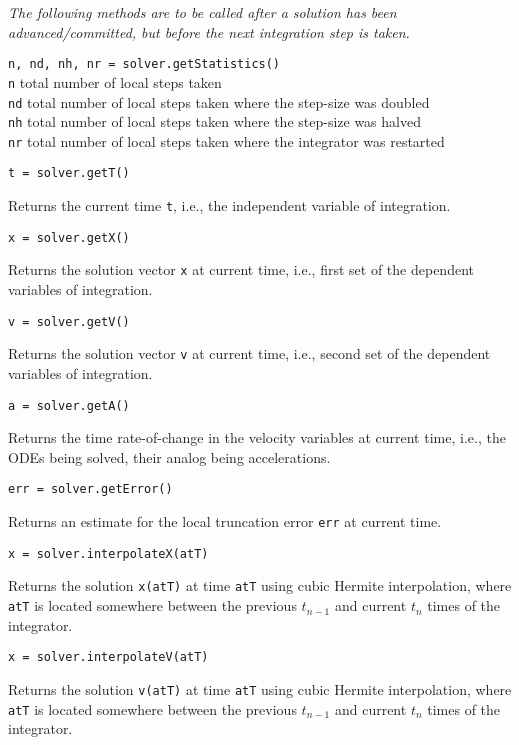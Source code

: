\medskip\noindent
\textit{The following methods are to be called after a solution has been advanced\slash committed, but before the next integration step is taken.}

\medskip\noindent
\texttt{n, nd, nh, nr = solver.getStatistics()} \\
\indent \texttt{n} \;\;\;\: total number of local steps taken \\
\indent \texttt{nd} \;\; total number of local steps taken where the step-size was doubled \\
\indent \texttt{nh} \;\; total number of local steps taken where the step-size was halved \\
\indent \texttt{nr} \;\; total number of local steps taken where the integrator was restarted 

\medskip\noindent
\texttt{t = solver.getT()}

\medskip\noindent
Returns the current time \texttt{t}, i.e., the independent variable of integration.

\medskip\noindent
\texttt{x = solver.getX()}

\medskip\noindent
Returns the solution vector \texttt{x} at current time, i.e., first set of the dependent variables of integration.

\newpage
\medskip\noindent
\texttt{v = solver.getV()}

\medskip\noindent
Returns the solution vector \texttt{v} at current time, i.e., second set of the dependent variables of integration.

\medskip\noindent
\texttt{a = solver.getA()} 

\medskip\noindent
Returns the time rate-of-change in the velocity variables at current time, i.e., the ODEs being solved, their analog being accelerations.

\medskip\noindent
\texttt{err = solver.getError()} 

\medskip\noindent
Returns an estimate for the local truncation error \texttt{err} at current time.

\medskip\noindent
\texttt{x = solver.interpolateX(atT)}

\medskip\noindent
Returns the solution \texttt{x(atT)} at time \texttt{atT} using cubic Hermite interpolation, where \texttt{atT} is located somewhere between the previous $t_{n-1}$ and current $t_n$ times of the integrator.

\medskip\noindent
\texttt{x = solver.interpolateV(atT)}

\medskip\noindent
Returns the solution \texttt{v(atT)} at time \texttt{atT} using cubic Hermite interpolation, where \texttt{atT} is located somewhere between the previous $t_{n-1}$ and current $t_n$ times of the integrator.
